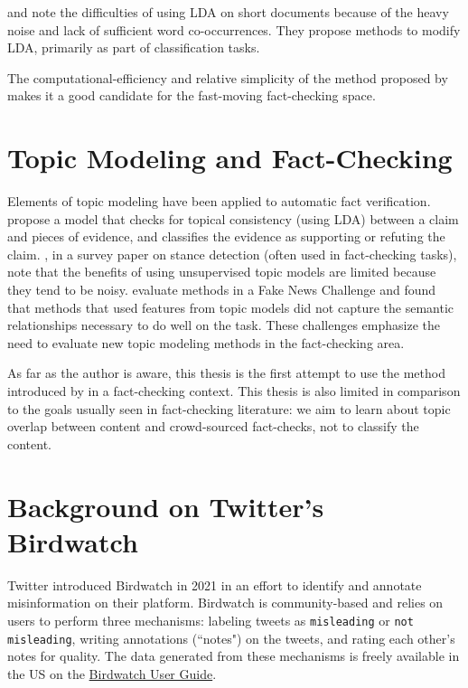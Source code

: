 \documentclass [11pt, proquest] {uwthesis}[2020/02/24]
\begin{document}
 \cite{chen2016short} and \cite{pang2016mr} note the difficulties of using LDA on short documents because of the heavy noise and lack of sufficient word co-occurrences. They propose methods to modify LDA, primarily as part of classification tasks.

 The computational-efficiency and relative simplicity of the method proposed by \cite{sia-etal-2020-tired} makes it a good candidate for the fast-moving fact-checking space.

 \section{Topic Modeling and Fact-Checking}
 Elements of topic modeling have been applied to automatic fact verification. \cite{si-etal-2021-topic} propose a model that checks for topical consistency (using LDA) between a claim and pieces of evidence, and classifies the evidence as supporting or refuting the claim. \cite{Hardalov2021ASO}, in a survey paper on stance detection (often used in fact-checking tasks),  note that the benefits of using unsupervised topic models are limited because they tend to be noisy. \cite{hanselowski-etal-2018-retrospective} evaluate methods in a Fake News Challenge and found that methods that used features from topic models did not capture the semantic relationships necessary to do well on the task. These challenges emphasize the need to evaluate new topic modeling methods in the fact-checking area.

 As far as the author is aware, this thesis is the first attempt to use the method introduced by \cite{sia-etal-2020-tired} in a fact-checking context. This thesis is also limited in comparison to the goals usually seen in fact-checking literature: we aim to learn about topic overlap between content and crowd-sourced fact-checks, not to classify the content.

 \section{Background on Twitter's Birdwatch}

Twitter introduced Birdwatch in 2021 \citep{coleman_2021} in an effort to identify and annotate misinformation on their platform. Birdwatch is community-based and relies on users to perform three mechanisms: labeling tweets as \verb|misleading| or \verb|not misleading|, writing annotations (``notes") on the tweets, and rating each other's notes for quality. The data generated from these mechanisms is freely available in the US on the \href{https://twitter.github.io/birdwatch/}{Birdwatch User Guide}.
\end{document}

